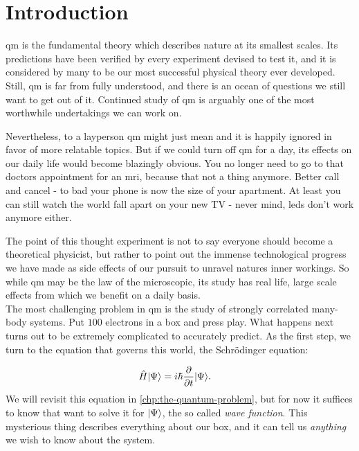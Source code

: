 \documentclass[Thesis.tex]{subfiles}
\begin{document}
\chapter{Introduction}
\label{chp:introduction}

\Gls{qm} is the fundamental theory which describes nature at its
smallest scales. Its predictions have been verified by every experiment
devised to test it, and it is considered by many to be our most successful physical
theory ever developed. Still, \gls{qm} is far from fully understood, and there is an ocean of
questions we still want to get out of it. Continued study of \gls{qm} is arguably one
of the most worthwhile undertakings we can work on.

Nevertheless, to a layperson \acrshort{qm} might just mean  and it
is happily ignored in favor of more relatable topics. But if we could turn off \gls{qm}
for a day, its effects on our daily life would become blazingly obvious. You no
longer need to go to that doctors appointment for an \acrshort{mri}, because that not a
thing anymore. Better call and cancel - to bad your phone is now the size of
your apartment. At least you can still watch the world fall apart on your new TV -
never mind, \acrshort{led}s don't work anymore either.

The point of this thought experiment is not to say everyone should become a
theoretical physicist, but rather to point out the immense technological
progress we have made as side effects of our pursuit to unravel natures inner
workings. So while \acrshort{qm} may be the law of the microscopic, its study
has real life, large scale effects from which we benefit on a daily basis.\\

The most challenging problem in \gls{qm} is the study of strongly correlated
many-body systems. Put $\num{100}$ electrons in a box and press play. What happens next
turns out to be extremely complicated to accurately predict. As the first step, we
turn to the equation that governs this world, the Schrödinger equation:

\begin{align}
  \label{eq:schrodinger-intro-def}
  \hat H| \Psi \rangle &= i\hbar \pdv{}{t}| \Psi \rangle.
\end{align}
We will revisit this equation in \cref{chp:the-quantum-problem}, but for now it
suffices to know that want to solve it for $| \Psi \rangle$, the so called \emph{wave
function}. This mysterious thing describes everything about our box, and it can
tell us \emph{anything} we wish to know about the system.
\end{document}
